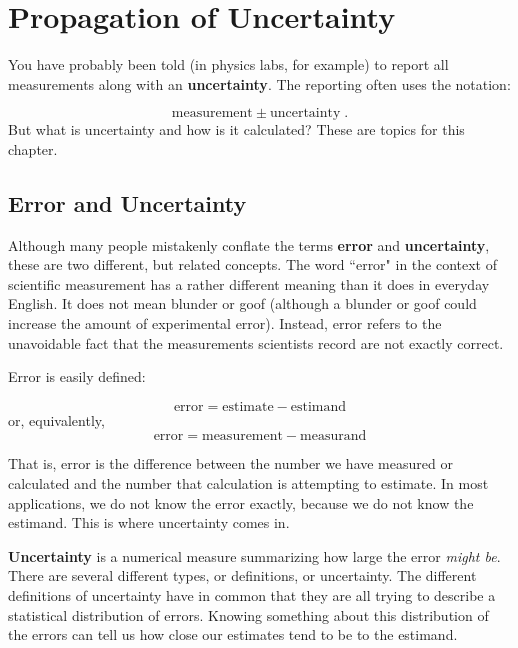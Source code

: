 \documentclass[twoside]{book}\usepackage[]{graphicx}\usepackage[]{xcolor}
\def\myindex#1{\index{#1}}
\def\term#1{\textbf{#1}}
\newlength{\tempfmlength}
\newenvironment{fmpage}[1]
     {
	 \medskip
	 \setlength{\tempfmlength}{#1}
	 \begin{lrbox}{\fmbox}
	   \begin{minipage}{#1}
		 \vspace*{.02\tempfmlength}
		 \hfill
	   \begin{minipage}{.95 \tempfmlength}}
		 {\end{minipage}\hfill
		 \vspace*{.015\tempfmlength}
		 \end{minipage}\end{lrbox}\fbox{\usebox{\fmbox}}
	 \medskip
	 }
\newenvironment{boxedText}[1][.98\textwidth]%
{%
\begin{center}
\begin{fmpage}{#1}
}%
{%
\end{fmpage}
\end{center}
}
\newcounter{example}[section]
\newif\ifsolutions
\newif\ifsolutionslocal
\begin{document}
\shipoutProblems

\ifsolutions
\ifsolutionslocal
\newpage
\section*{Solutions}
\shipoutSolutions
\fi
\fi
 





\chapter{Propagation of Uncertainty}
\label{chap:propagation}%

\myindex{uncertainty|defidx}
You have probably been told (in physics labs, for example) to report all measurements
along with an \term{uncertainty}.  The reporting often uses the notation:

\[ \mbox{measurement} \pm \mbox{uncertainty} \;. \]
%
But what is uncertainty and how is it calculated?  These are topics for this chapter.

\section{Error and Uncertainty}
Although many people mistakenly conflate the terms \term{error} and \term{uncertainty}, 
these are two different, but related concepts.  
The word ``error" in the context of scientific measurement has a rather
different meaning than it does in everyday English. It does not mean blunder or
goof (although a blunder or goof could increase the amount of experimental error). 
Instead, error refers to the unavoidable fact that
the measurements scientists record are not exactly correct.


Error is easily defined:

\begin{boxedText}
	\[ \mbox{error} = \mbox{estimate} - \mbox{estimand} \]
or, equivalently,
	\[ \mbox{error} = \mbox{measurement} - \mbox{measurand} \]
\end{boxedText}
That is, error is the difference between the number we have measured or calculated and the 
number that calculation is attempting to estimate.  In most applications, we do not know 
the error exactly, because we do not know the estimand.  This is where uncertainty comes in.

\term{Uncertainty} is a numerical measure summarizing how large the error \emph{might be}.  There are several different types, or definitions, or uncertainty.  The different definitions of uncertainty have in common that they are all trying to describe a statistical distribution of errors.  
Knowing something about this distribution
of the errors can tell us how close our estimates tend to be to the estimand.
\end{document}
